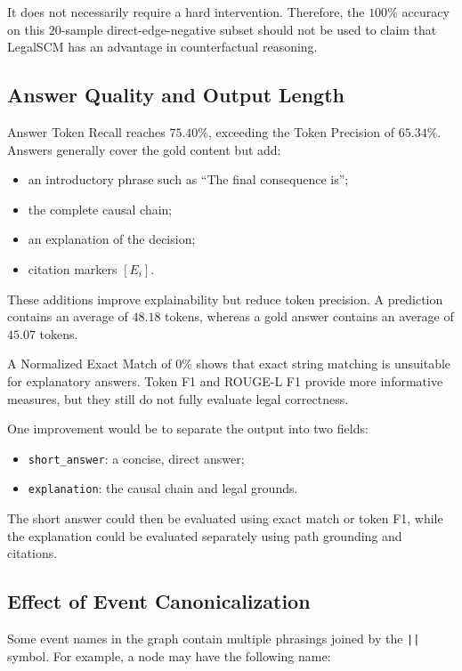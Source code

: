It does not necessarily require a hard intervention. Therefore, the
\(100\%\) accuracy on this \(20\)-sample direct-edge-negative subset should
not be used to claim that LegalSCM has an advantage in counterfactual
reasoning.

\subsection{Answer Quality and Output Length}

Answer Token Recall reaches \(75.40\%\), exceeding the Token Precision of
\(65.34\%\). Answers generally cover the gold content but add:

\begin{itemize}
    \item an introductory phrase such as ``The final consequence is'';
    \item the complete causal chain;
    \item an explanation of the decision;
    \item citation markers \([E_i]\).
\end{itemize}

These additions improve explainability but reduce token precision. A
prediction contains an average of \(48.18\) tokens, whereas a gold answer
contains an average of \(45.07\) tokens.

A Normalized Exact Match of \(0\%\) shows that exact string matching is
unsuitable for explanatory answers. Token F1 and ROUGE-L F1 provide more
informative measures, but they still do not fully evaluate legal
correctness.

One improvement would be to separate the output into two fields:

\begin{itemize}
    \item \texttt{short\_answer}: a concise, direct answer;
    \item \texttt{explanation}: the causal chain and legal grounds.
\end{itemize}

The short answer could then be evaluated using exact match or token F1,
while the explanation could be evaluated separately using path grounding
and citations.

\subsection{Effect of Event Canonicalization}

Some event names in the graph contain multiple phrasings joined by the
\texttt{||} symbol. For example, a node may have the following name:


